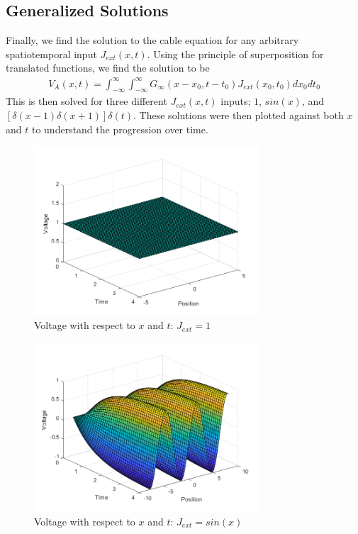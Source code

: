 \documentclass{article}
\begin{document}
\subsection{Generalized Solutions}
Finally, we find the solution to the cable equation for any arbitrary spatiotemporal input $J_{ext}(x,t)$. Using the principle of superposition for translated functions, we find the solution to be 
\begin{gather*}
    V_A(x,t) = \int_{-\infty}^\infty\int_{-\infty}^\infty G_\infty (x-x_0,t-t_0)J_{ext}(x_0,t_0)dx_0dt_0
\end{gather*}
This is then solved for three different $J_{ext}(x,t)$ inputs; $1$, $sin(x)$, and $[\delta(x-1)\delta(x+1)]\delta(t)$. These solutions were then plotted against both $x$ and $t$ to understand the progression over time.

\begin{figure}[H]
\centering
\includegraphics[width=0.75\textwidth]{fig4.png}
\caption{Voltage with respect to $x$ and $t$: $J_{ext}=1$}
\label{fig:gen_sol_1}
\end{figure}

\begin{figure}[H]
\centering
\includegraphics[width=0.75\textwidth]{fig5.png}
\caption{Voltage with respect to $x$ and $t$: $J_{ext}=sin(x)$}
\label{fig:gen_sol_sin}
\end{figure}
\end{document}
